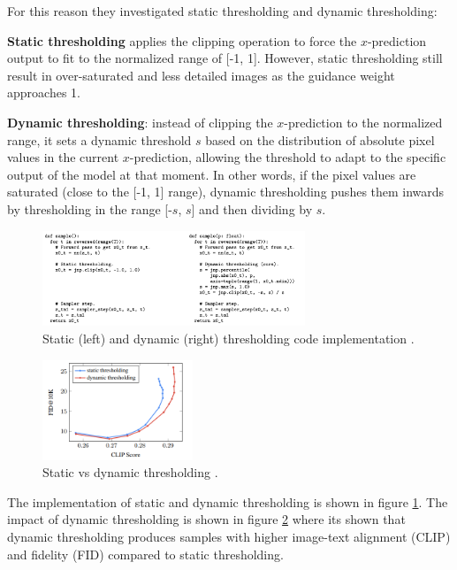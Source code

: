 For this reason they investigated static thresholding and dynamic thresholding:

\textbf{Static thresholding} applies the clipping operation to force the $x$-prediction output to fit to the normalized range of [-1, 1]. However, static thresholding still result in over-saturated and less detailed images as the guidance weight approaches 1.

\textbf{Dynamic thresholding}: instead of clipping the $x$-prediction to the normalized range, it sets a dynamic threshold $s$ based on the distribution of absolute pixel values in the current $x$-prediction, allowing the threshold to adapt to the specific output of the model at that moment. In other words, if the pixel values are saturated (close to the [-1, 1] range), dynamic thresholding pushes them inwards by thresholding in the range [-$s$, $s$] and then dividing by $s$.

\begin{figure}
    \centering
    \includegraphics[width=0.7\textwidth]{images/imagen/static_dynamic_thresholding.png}
    \caption{Static (left) and dynamic (right) thresholding code implementation \cite{imagen}.}
    \label{fig:imagen_dynamic_thresholding}
\end{figure}

\begin{figure}
    \centering
    \includegraphics[width=0.4\textwidth]{images/imagen/static_vs_dynamic_thresholding.png}
    \caption{Static vs dynamic thresholding \cite{imagen}.}
    \label{fig:imagen_static_vs_dynamic_thresholding}
\end{figure}

The implementation of static and dynamic thresholding is shown in figure \ref{fig:imagen_dynamic_thresholding}. The impact of dynamic thresholding is shown in figure \ref{fig:imagen_static_vs_dynamic_thresholding} where its shown that dynamic thresholding produces samples with higher image-text alignment (CLIP) and fidelity (FID) compared to static thresholding.
















